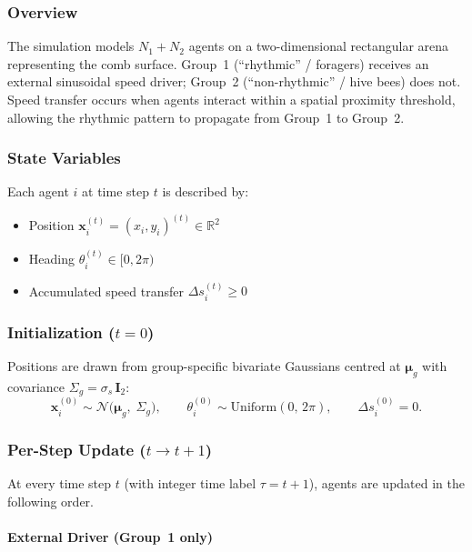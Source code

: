 \documentclass{article}
\newcommand{\vect}[1]{\mathbf{#1}}
\newcommand{\added}[1]{{\color{blue}#1}}
\newcommand{\added}[1]{#1}
\begin{document}
\added{
\subsubsection*{Overview}

The simulation models $N_1 + N_2$ agents on a two-dimensional rectangular arena
representing the comb surface.  Group~1 (``rhythmic'' / foragers) receives an
external sinusoidal speed driver; Group~2 (``non-rhythmic'' / hive bees) does
not.  Speed transfer occurs when agents interact within a spatial proximity
threshold, allowing the rhythmic pattern to propagate from Group~1 to Group~2.

\subsubsection*{State Variables}

Each agent $i$ at time step $t$ is described by:
\begin{itemize}
  \item Position $\vect{x}_i^{(t)} = (x_i, y_i)^{(t)} \in \mathbb{R}^2$
  \item Heading $\theta_i^{(t)} \in [0, 2\pi)$
  \item Accumulated speed transfer $\Delta s_i^{(t)} \geq 0$
\end{itemize}

\subsubsection*{Initialization ($t = 0$)}

Positions are drawn from group-specific bivariate Gaussians centred at
$\vect{\mu}_g$ with covariance $\Sigma_g = \sigma_s \, \vect{I}_2$:
%
\begin{equation}
  \vect{x}_i^{(0)} \sim \mathcal{N}\!\bigl(\vect{\mu}_g,\; \Sigma_g\bigr),
  \qquad
  \theta_i^{(0)} \sim \mathrm{Uniform}(0,\, 2\pi),
  \qquad
  \Delta s_i^{(0)} = 0.
\end{equation}

\subsubsection*{Per-Step Update ($t \to t+1$)}

At every time step $t$ (with integer time label $\tau = t + 1$), agents are
updated in the following order.

\paragraph{External Driver (Group~1 only)}

}
\end{document}
